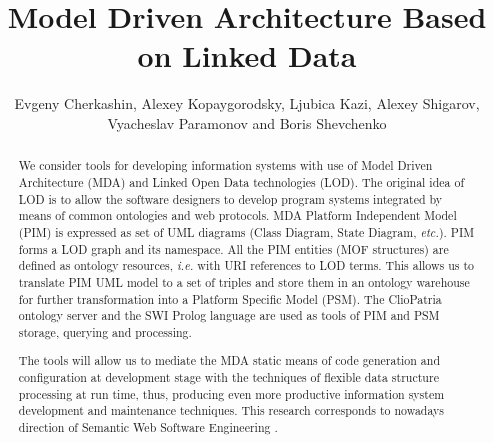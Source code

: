 \documentclass[runningheads]{llncs}
\begin{document}


\date{}
\title{Model Driven Architecture Based on Linked Data}

\author{Evgeny Cherkashin,
Alexey Kopaygorodsky,
Ljubica Kazi,
Alexey Shigarov,
Vyacheslav Paramonov
and
Boris Shevchenko}

\maketitle

\begin{abstract}
We consider tools for developing information systems with use of Model Driven Architecture (MDA) and Linked Open Data technologies (LOD).  The original idea of LOD is to allow the software designers to develop program systems integrated by means of common ontologies and web protocols.  MDA Platform Independent Model (PIM) is expressed as set of UML diagrams (Class Diagram, State Diagram, \emph{etc.}).  PIM forms a LOD graph and its namespace.  All the PIM entities (MOF structures) are defined as ontology resources, \emph{i.e.} with URI references to LOD terms.  This allows us to translate PIM UML model to a set of triples and store them in an ontology warehouse for further transformation into a Platform Specific Model (PSM).  The ClioPatria ontology server and the SWI Prolog language are used as tools of PIM and PSM storage, querying and processing.

The tools will allow us to mediate the MDA static means of code generation and configuration at development stage with the techniques of flexible data structure processing at run time, thus, producing even more productive information system development and maintenance techniques.  This research corresponds to nowadays direction of Semantic Web Software Engineering \cite{SWEB}.
\end{abstract}
\end{document}
